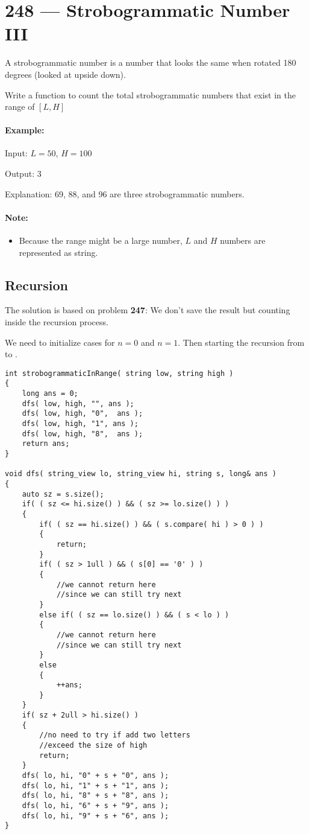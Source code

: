 \section{248 --- Strobogrammatic Number III}
A strobogrammatic number is a number that looks the same when rotated 180 degrees (looked at upside down).

Write a function to count the total strobogrammatic numbers that exist in the range of $[L,H]$

\paragraph{Example:}
\begin{flushleft}
Input: $L = 50$, $H = 100$

Output: 3 

Explanation: 69, 88, and 96 are three strobogrammatic numbers.
\end{flushleft}

\paragraph{Note:}
\begin{itemize}
\item Because the range might be a large number, $L$ and $H$ numbers are represented as string.
\end{itemize}


\subsection{Recursion}
The solution is based on problem \textbf{247}: We don't save the result but counting inside the recursion process.

We need to initialize cases for $n=0$ and $n=1$. Then starting the recursion from  to . 

\setcounter{lstlisting}{0}
\begin{lstlisting}[style=customc, caption={Recursion}]
int strobogrammaticInRange( string low, string high )
{
    long ans = 0;
    dfs( low, high, "", ans );
    dfs( low, high, "0",  ans );
    dfs( low, high, "1", ans );
    dfs( low, high, "8",  ans );
    return ans;
}

void dfs( string_view lo, string_view hi, string s, long& ans )
{
    auto sz = s.size();
    if( ( sz <= hi.size() ) && ( sz >= lo.size() ) )
    {
        if( ( sz == hi.size() ) && ( s.compare( hi ) > 0 ) )
        {
            return;
        }
        if( ( sz > 1ull ) && ( s[0] == '0' ) )
        {
            //we cannot return here
            //since we can still try next
        }
        else if( ( sz == lo.size() ) && ( s < lo ) )
        {
            //we cannot return here
            //since we can still try next
        }
        else
        {
            ++ans;
        }
    }
    if( sz + 2ull > hi.size() )
    {
        //no need to try if add two letters
        //exceed the size of high
        return;
    }
    dfs( lo, hi, "0" + s + "0", ans );
    dfs( lo, hi, "1" + s + "1", ans );
    dfs( lo, hi, "8" + s + "8", ans );
    dfs( lo, hi, "6" + s + "9", ans );
    dfs( lo, hi, "9" + s + "6", ans );
}
\end{lstlisting}